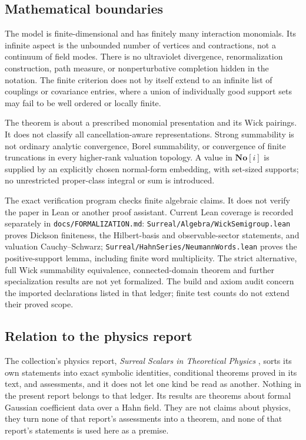 \documentclass[11pt,letterpaper]{article}
\numberwithin{equation}{section}
\theoremstyle{definition}
\theoremstyle{remark}
\newcommand{\SC}{\mathbf{No}[i]}
\begin{document}
\subsection{Mathematical boundaries}
\label{wick:sub:boundaries}

The model is finite-dimensional and has finitely many interaction monomials.
Its infinite aspect is the unbounded number of vertices and contractions,
not a continuum of field modes. There is no ultraviolet divergence,
renormalization construction, path measure, or nonperturbative completion
hidden in the notation. The finite criterion does not by itself extend to
an infinite list of couplings or covariance entries, where a union of
individually good support sets may fail to be well ordered or locally finite.

The theorem is about a prescribed monomial presentation and its Wick
pairings. It does not classify all cancellation-aware representations.
Strong summability is not ordinary analytic convergence, Borel summability,
or convergence of finite truncations in every higher-rank valuation
topology. A value in $\SC$ is supplied by an explicitly chosen normal-form
embedding, with set-sized supports; no unrestricted proper-class integral
or sum is introduced.

The exact verification program checks finite algebraic claims. It does not
verify the paper in Lean or another proof assistant. Current Lean coverage
is recorded separately in \texttt{docs/FORMALIZATION.md}:
\texttt{Surreal/Algebra/WickSemigroup.lean} proves Dickson finiteness,
the Hilbert-basis and observable-sector statements, and valuation
Cauchy--Schwarz; \texttt{Surreal/HahnSeries/NeumannWords.lean} proves
the positive-support lemma, including finite word multiplicity.
The strict alternative, full Wick summability equivalence, connected-domain
theorem and further specialization results are not yet formalized.
The build and axiom audit concern the imported declarations listed in that
ledger; finite test counts do not extend their proved scope.

\subsection{Relation to the physics report}
\label{wick:sub:physics}

The collection's physics report, \emph{Surreal Scalars in Theoretical
Physics} \cite{PhysReport}, sorts its own statements into exact symbolic
identities, conditional theorems proved in its text, and assessments, and it
does not let one kind be read as another. Nothing in the present report
belongs to that ledger. Its results are theorems about formal Gaussian
coefficient data over a Hahn field. They are not claims about physics, they
turn none of that report's assessments into a theorem, and none of that
report's statements is used here as a premise.
\end{document}
